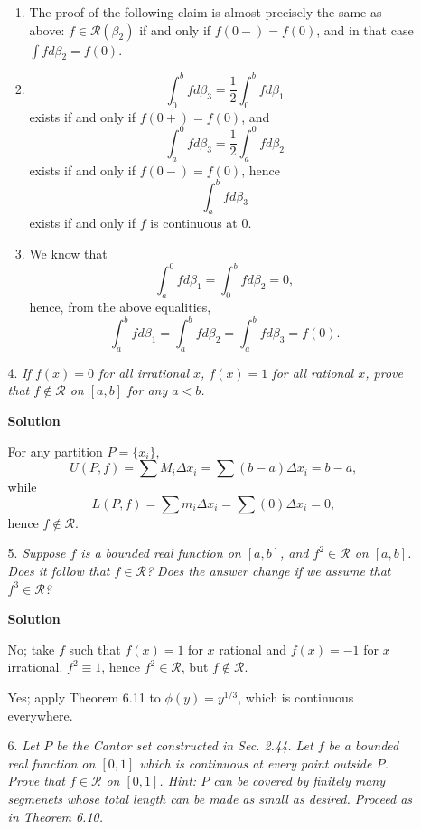 \documentclass{article}
\begin{document}
\begin{enumerate}
\begin{itemize}
\begin{enumerate}
\item The proof of the following claim is almost precisely the same as above:  \(f \in \mathcal{R}(\beta_2)\) if and only if \(f(0-) = f(0)\), and in that case \(\int f d\beta_2 = f(0)\).

\item
\[\int_0^b f d\beta_3 = \frac{1}{2} \int_0^b f d\beta_1\]
exists if and only if \(f(0+) = f(0)\), and
\[\int_a^0 f d\beta_3 = \frac{1}{2} \int_a^0 f d\beta_2\]
exists if and only if \(f(0-) = f(0)\), hence
\[\int_a^b f d\beta_3\]
exists if and only if \(f\) is continuous at \(0\).

\item We know that
\[\int_a^0 f d\beta_1 = \int_0^b f d\beta_2 = 0,\]
hence, from the above equalities,
\[\int_a^b f d\beta_1 = \int_a^b f d\beta_2 = \int_a^b f d\beta_3 = f(0).\]

\end{enumerate}



\item[4.] {\em If \(f(x) = 0\) for all irrational \(x\), \(f(x) = 1\) for all rational \(x\), prove that \(f \notin \mathcal{R}\) on \([a,b]\) for any \(a < b\).}

{\bf Solution}

For any partition \(P = \{x_i\}\),
\[U(P,f) = \sum M_i \Delta x_i = \sum (b - a) \Delta x_i = b - a,\]
while
\[L(P,f) = \sum m_i \Delta x_i = \sum (0) \Delta x_i = 0,\]
hence \(f \notin \mathcal{R}\).



\item[5.] {\em Suppose \(f\) is a bounded real function on \([a,b]\), and \(f^2 \in \mathcal{R}\) on \([a,b]\).  Does it follow that \(f \in \mathcal{R}\)?  Does the answer change if we assume that \(f^3 \in \mathcal{R}\)?}

{\bf Solution}

No; take \(f\) such that \(f(x) = 1\) for \(x\) rational and \(f(x) = -1\) for \(x\) irrational.  \(f^2 \equiv 1\), hence \(f^2 \in \mathcal{R}\), but \(f \notin \mathcal{R}\).

Yes; apply Theorem 6.11 to \(\phi(y) = y^{1/3}\), which is continuous everywhere.



\item[6.] {\em Let \(P\) be the Cantor set constructed in Sec. 2.44.  Let \(f\) be a bounded real function on \([0,1]\) which is continuous at every point outside \(P\).  Prove that \(f \in \mathcal{R}\) on \([0,1]\).  {\em Hint:}  \(P\) can be covered by finitely many segmenets whose total length can be made as small as desired.  Proceed as in Theorem 6.10.}


\end{itemize}
\end{enumerate}
\end{document}

